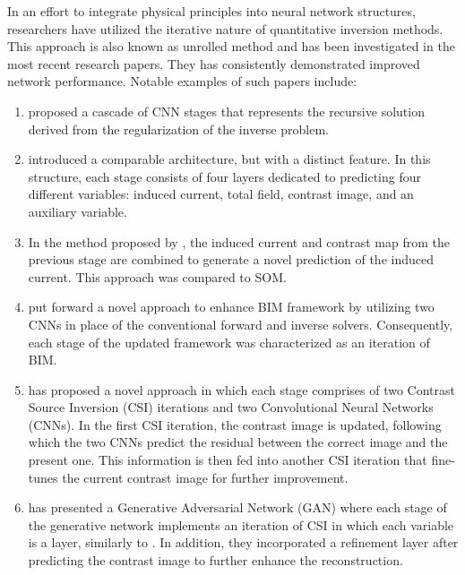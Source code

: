 		In an effort to integrate physical principles into neural network structures, researchers have utilized the iterative nature of quantitative inversion methods. This approach is also known as unrolled method and has been investigated in the most recent research papers. They has consistently demonstrated improved network performance. Notable examples of such papers include:
		\begin{enumerate}
			\item \cite{li2019deepnis} proposed a cascade of CNN stages that represents the recursive solution derived from the regularization of the inverse problem.
			\item \cite{liu2022physical} introduced a comparable architecture, but with a distinct feature. In this structure, each stage consists of four layers dedicated to predicting four different variables: induced current, total field, contrast image, and an auxiliary variable.
			\item In the method proposed by \cite{liu2022somnet}, the induced current and contrast map from the previous stage are combined to generate a novel prediction of the induced current. This approach was compared to SOM.
			\item \cite{shan2023neural} put forward a novel approach to enhance BIM framework by utilizing two CNNs in place of the conventional forward and inverse solvers. Consequently, each stage of the updated framework was characterized as an iteration of BIM.
			\item \cite{zhang2023unrolled} has proposed a novel approach in which each stage comprises of two Contrast Source Inversion (CSI) iterations and two Convolutional Neural Networks (CNNs). In the first CSI iteration, the contrast image is updated, following which the two CNNs predict the residual between the correct image and the present one. This information is then fed into another CSI iteration that fine-tunes the current contrast image for further improvement.
			\item \cite{zhou2022deep} has presented a Generative Adversarial Network (GAN) where each stage of the generative network implements an iteration of CSI in which each variable is a layer, similarly to \cite{liu2022physical}. In addition, they incorporated a refinement layer after predicting the contrast image to further enhance the reconstruction.
		\end{enumerate}
		
